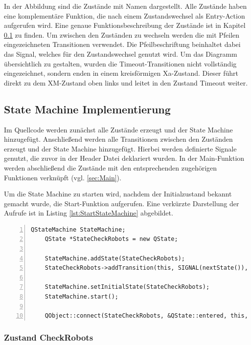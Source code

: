 In der Abbildung sind die Zustände mit Namen dargestellt. Alle Zustände haben eine komplementäre Funktion, die nach einem Zustandswechsel als Entry-Action aufgerufen wird. Eine genaue Funktionsbeschreibung der Zustände ist in Kapitel \ref{sec:StateMachineImplementierung} zu finden. Um zwischen den Zuständen zu wechseln werden die mit Pfeilen eingezeichneten Transitionen verwendet. Die Pfeilbeschriftung beinhaltet dabei das Signal, welches für den Zustandswechsel genutzt wird. Um das Diagramm übersichtlich zu gestalten, wurden die Timeout-Transitionen nicht vollständig eingezeichnet, sondern enden in einem kreisförmigen Xa-Zustand. Dieser führt direkt zu dem XM-Zustand oben links und leitet in den Zustand Timeout weiter. 

\subsection{State Machine Implementierung}
\label{sec:StateMachineImplementierung}

Im Quellcode werden zunächst alle Zustände erzeugt und der State Machine hinzugefügt. Anschließend werden alle Transitionen zwischen den Zuständen erzeugt und der State Machine hinzugefügt. Hierbei werden definierte Signale genutzt, die zuvor in der Header Datei deklariert wurden. In der Main-Funktion werden abschließend die Zustände mit den entsprechenden zugehörigen Funktionen verknüpft (vgl. \ref{sec:Main}). 

Um die State Machine zu starten wird, nachdem der Initialzustand bekannt gemacht wurde, die Start-Funktion aufgerufen. Eine verkürzte Darstellung der Aufrufe ist in Listing \ref{lst:StartStateMachine} abgebildet. 

\begin{lstlisting}[frame=single, breaklines=true, numbers=left, stepnumber=2, firstnumber=1, numberstyle = \tiny, caption=Start und Initialisierung der State Machine,label=lst:StartStateMachine]
    QStateMachine StateMachine;
    QState *StateCheckRobots = new QState;

    StateMachine.addState(StateCheckRobots);
    StateCheckRobots->addTransition(this, SIGNAL(nextState()), StateCheckAkku);

    StateMachine.setInitialState(StateCheckRobots);
    StateMachine.start();

    QObject::connect(StateCheckRobots, &QState::entered, this, &Fertigungsplanung::CheckRobots);
\end{lstlisting}

\subsubsection{Zustand CheckRobots}

